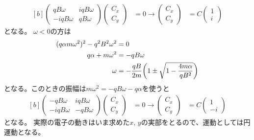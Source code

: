 \documentclass[../../master.tex]{subfiles}
\begin{document}
\begin{equation}\begin{aligned}[b]
    \begin{pmatrix}
        qB\omega & iqB\omega\\
        -iqB\omega & qB\omega
    \end{pmatrix}\begin{pmatrix}
        C_x\\ C_y
    \end{pmatrix}
    &=0
    \rightarrow \begin{pmatrix}
        C_x\\ C_y
    \end{pmatrix} &= C\begin{pmatrix}
        1\\i
    \end{pmatrix}
\end{aligned}\end{equation}
となる。
\(\omega<0\)の方は
\begin{equation}\begin{aligned}[b]
    (q\alpha m\omega^2)^2-q^2B^2\omega^2&=0\\
    q\alpha+m\omega^2 &= -qB\omega\\
    \omega &= -\frac{qB}{2m}\qty(1\pm\sqrt{1-\frac{4m\alpha}{qB^2}})
\end{aligned}\end{equation}
となる。このときの振幅は\(m\omega^2 = -qB\omega -q\alpha\)を使うと
\begin{equation}\begin{aligned}[b]
    \begin{pmatrix}
        -qB\omega & iqB\omega\\
        -iqB\omega & -qB\omega
    \end{pmatrix}\begin{pmatrix}
        C_x\\ C_y
    \end{pmatrix}
    &=0
    \rightarrow \begin{pmatrix}
        C_x\\ C_y
    \end{pmatrix} &= C\begin{pmatrix}
        1\\-i
    \end{pmatrix}
\end{aligned}\end{equation}
となる。
実際の電子の動きはいま求めた\(x,\,y\)の実部をとるので、運動としては円運動となる。
\end{document}
